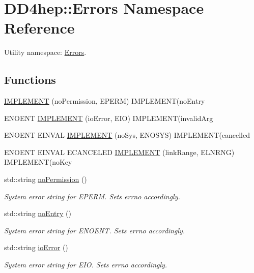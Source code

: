 \hypertarget{namespace_d_d4hep_1_1_errors}{
\section{DD4hep::Errors Namespace Reference}
\label{namespace_d_d4hep_1_1_errors}
}


Utility namespace: \hyperlink{namespace_d_d4hep_1_1_errors}{Errors}.  
\subsection*{Functions}
\begin{DoxyCompactItemize}
\item 
\hyperlink{namespace_d_d4hep_1_1_errors_ada3397937d99e255f7b5770f5ab80888}{IMPLEMENT} (noPermission, EPERM) IMPLEMENT(noEntry
\item 
ENOENT \hyperlink{namespace_d_d4hep_1_1_errors_ae2932c4d59d7f6a7476733ba238050f6}{IMPLEMENT} (ioError, EIO) IMPLEMENT(invalidArg
\item 
ENOENT EINVAL \hyperlink{namespace_d_d4hep_1_1_errors_a7875dfba79f4c8a0fbc5b9786730ca20}{IMPLEMENT} (noSys, ENOSYS) IMPLEMENT(cancelled
\item 
ENOENT EINVAL ECANCELED \hyperlink{namespace_d_d4hep_1_1_errors_ad826680faeb314dfa60c60a0d4ee3692}{IMPLEMENT} (linkRange, ELNRNG) IMPLEMENT(noKey
\item 
std::string \hyperlink{namespace_d_d4hep_1_1_errors_aa34e378024a1269ccd3f23a0c9d9607b}{noPermission} ()
\begin{DoxyCompactList}\small\item\em System error string for EPERM. Sets errno accordingly. \item\end{DoxyCompactList}\item 
std::string \hyperlink{namespace_d_d4hep_1_1_errors_aca021db58d08e5935eea31a7d0b7d1b7}{noEntry} ()
\begin{DoxyCompactList}\small\item\em System error string for ENOENT. Sets errno accordingly. \item\end{DoxyCompactList}\item 
std::string \hyperlink{namespace_d_d4hep_1_1_errors_af232117521264a5f6e1211c887e265fd}{ioError} ()
\begin{DoxyCompactList}\small\item\em System error string for EIO. Sets errno accordingly. \item\end{DoxyCompactList}\item 

\end{DoxyCompactItemize}
